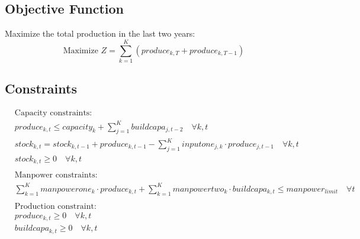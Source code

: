\documentclass{article}
\begin{document}
\subsection*{Objective Function}
Maximize the total production in the last two years:
\[
\text{Maximize } Z = \sum_{k=1}^{K} (produce_{k,T} + produce_{k,T-1})
\]

\subsection*{Constraints}
\begin{align}
    & \text{Capacity constraints:} \\
    & produce_{k,t} \leq capacity_k + \sum_{j=1}^{K} buildcapa_{j,t-2} \quad \forall k, t \\
    & stock_{k,t} = stock_{k,t-1} + produce_{k,t-1} - \sum_{j=1}^{K} inputone_{j,k} \cdot produce_{j,t-1} \quad \forall k, t \\
    & stock_{k,t} \geq 0 \quad \forall k, t \\
    & \\
    & \text{Manpower constraints:} \\
    & \sum_{k=1}^{K} manpowerone_k \cdot produce_{k,t} + \sum_{k=1}^{K} manpowertwo_k \cdot buildcapa_{k,t} \leq manpower_{limit} \quad \forall t \\
    & \\
    & \text{Production constraint:} \\
    & produce_{k,t} \geq 0 \quad \forall k, t \\
    & buildcapa_{k,t} \geq 0 \quad \forall k, t \\
\end{align}
\end{document}
